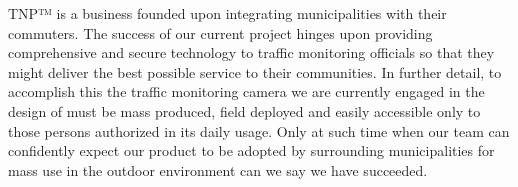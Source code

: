 TNP™ is a business founded upon integrating municipalities with their commuters. The success of our current project hinges upon providing comprehensive and secure technology to traffic monitoring officials so that they might deliver the best possible service to their communities. In further detail, to accomplish this the traffic monitoring camera we are currently engaged in the design of must be mass produced, field deployed and easily accessible only to those persons authorized in its daily usage. Only at such time when our team can confidently expect our product to be adopted by surrounding municipalities for mass use in the outdoor environment can we say we have succeeded.
